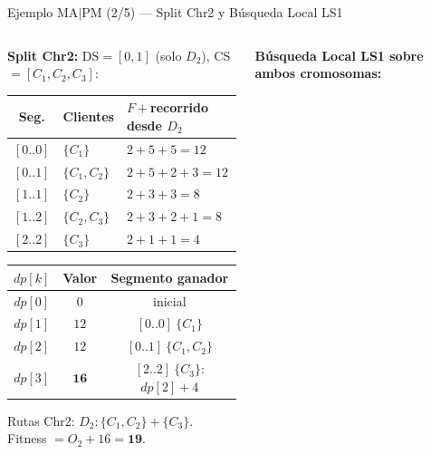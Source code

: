 \documentclass[aspectratio=169,10pt]{beamer}
\begin{document}
\begin{frame}{Ejemplo MA$|$PM (2/5) --- Split Chr2 y Búsqueda Local LS1}
  \begin{columns}[T,onlytextwidth]
    \begin{column}{0.50\textwidth}
      \textbf{Split Chr2:} DS$=[0,1]$ (solo $D_2$), CS$=[C_1,C_2,C_3]$:
      \vspace{0.15em}
      \begin{center}\footnotesize
      \begin{tabular}{cll}
        \toprule
        Seg. & Clientes & $F+$recorrido desde $D_2$ \\
        \midrule
        $[0..0]$ & $\{C_1\}$     & $2{+}5{+}5=12$ \\
        $[0..1]$ & $\{C_1,C_2\}$ & $2{+}5{+}2{+}3=12$ \\
        $[1..1]$ & $\{C_2\}$     & $2{+}3{+}3=8$ \\
        $[1..2]$ & $\{C_2,C_3\}$ & $2{+}3{+}2{+}1=8$ \\
        $[2..2]$ & $\{C_3\}$     & $2{+}1{+}1=4$ \\
        \bottomrule
      \end{tabular}
      \end{center}
      \vspace{0.1em}
      \begin{center}\footnotesize
      \begin{tabular}{ccc}
        \toprule
        $dp[k]$ & Valor & Segmento ganador \\
        \midrule
        $dp[0]$ & $0$  & inicial \\
        $dp[1]$ & $12$ & $[0..0]\ \{C_1\}$ \\
        $dp[2]$ & $12$ & $[0..1]\ \{C_1,C_2\}$ \\
        $dp[3]$ & $\mathbf{16}$ & $[2..2]\ \{C_3\}$: $dp[2]{+}4$ \\
        \bottomrule
      \end{tabular}
      \end{center}
      \small Rutas Chr2: $D_2{:}\{C_1,C_2\}{+}\{C_3\}$.\quad
      Fitness $= O_2{+}16 = \mathbf{19}$.
    \end{column}
    \begin{column}{0.48\textwidth}
      \textbf{Búsqueda Local LS1 sobre ambos cromosomas:}
      \vspace{0.15em}
      \begin{center}\footnotesize
      \begin{tabular}{llc}

\end{tabular}
\end{center}
\end{column}
\end{columns}
\end{frame}
\end{document}
